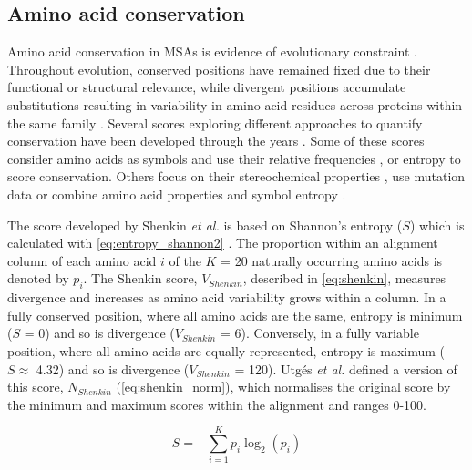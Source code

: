 \subsection{Amino acid conservation}

Amino acid conservation in MSAs is evidence of evolutionary constraint \cite{DAYHOFF_1978_PAM}. Throughout evolution, conserved positions have remained fixed due to their functional or structural relevance, while divergent positions accumulate substitutions resulting in variability in amino acid residues across proteins within the same family \cite{ZUCKERKANDL_1965_DIVERGENCE}. Several scores exploring different approaches to quantify conservation have been developed through the years \cite{VALDAR_2002_SCORES}. Some of these scores consider amino acids as symbols and use their relative frequencies \cite{WU_1970_SCORE, JORES_1990_SCORE, LOCKLESS_1999_SCORE}, or entropy \cite{SANDER_1991_SCORE, SHENKIN_1991_SCORE, GERSTEIN_1995_SCORE} to score conservation. Others focus on their stereochemical properties \cite{TAYLOR_1986_PROPERTIES, ZVELEBIL_1987_PREDICTION}, use mutation data \cite{KARLIN_1996_SCORE, THOMPSON_1997_SCORE, LANDGRAF_1999_SCORE, PILPEL_1999_SCORE, ARMON_2001_SCORE, VALDAR_2001_SCORE} or combine amino acid properties and symbol entropy \cite{WILLIAMSON_1995_SCORE, MIRNY_1999_SCORE}.

The score developed by Shenkin \textit{et al.} \cite{SHENKIN_1991_SCORE} is based on Shannon's entropy ($S$) which is calculated with \autoref{eq:entropy_shannon2} \cite{SHANNON_1948_ENTROPY}. The proportion within an alignment column of each amino acid $i$ of the $K$ = 20 naturally occurring amino acids is denoted by $p_i$. The Shenkin score, $V_{Shenkin}$, described in \autoref{eq:shenkin}, measures divergence and increases as amino acid variability grows within a column. In a fully conserved position, where all amino acids are the same, entropy is minimum ($S$ = 0) and so is divergence ($V_{Shenkin}$ = 6). Conversely, in a fully variable position, where all amino acids are equally represented, entropy is maximum ($S \approx$ 4.32) and so is divergence ($V_{Shenkin}$ = 120). Utgés \textit{et al.} \cite{UTGES_2021_ANKS} defined a version of this score, $N_{Shenkin}$ (\autoref{eq:shenkin_norm}), which normalises the original score by the minimum and maximum scores within the alignment and ranges 0-100.

\begin{equation}
S = - \sum_{i=1}^{K} p_i \log_2(p_i)
\label{eq:entropy_shannon2}
\end{equation}

